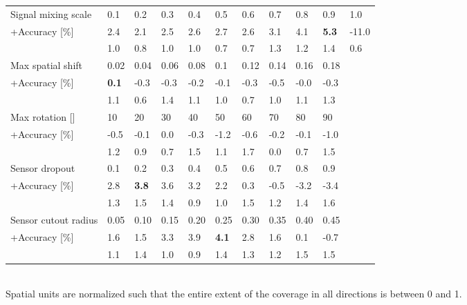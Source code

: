 \documentclass{article}
\newcommand{\std}[1]{{\scriptsize{#1}}}
\begin{document}
\begin{table}
\begin{tabular}{l|llllllllll}
    \midrule
Signal mixing scale
    & 0.1 & 0.2 & 0.3 & 0.4 & 0.5 & 0.6 & 0.7 & 0.8 & 0.9 & 1.0 \\
    \hspace{5pt}+Accuracy [\%]
    & 2.4 & 2.1 & 2.5 & 2.6 & 2.7 & 2.6 & 3.1 & 4.1 & \textbf{5.3} & -11.0 \\
    & \std{1.0} & \std{0.8} & \std{1.0} & \std{1.0} & \std{0.7} & \std{0.7} & \std{1.3} & \std{1.2} & \std{1.4} & \std{0.6} \\
    \midrule

Max spatial shift
    & 0.02 & 0.04 & 0.06 & 0.08 & 0.1 & 0.12 & 0.14 & 0.16 & 0.18 \\
    \hspace{5pt}+Accuracy [\%]
    & \textbf{0.1} & -0.3 & -0.3 & -0.2 & -0.1 & -0.3 & -0.5 & -0.0 & -0.3 \\
    & \std{1.1} & \std{0.6} & \std{1.4} & \std{1.1} & \std{1.0} & \std{0.7} & \std{1.0} & \std{1.1} & \std{1.3} \\
    \midrule

Max rotation []
    & 10 & 20 & 30 & 40 & 50 & 60 & 70 & 80 & 90 \\
    \hspace{5pt}+Accuracy [\%]
    & -0.5 & -0.1 & 0.0 & -0.3 & -1.2 & -0.6 & -0.2 & -0.1 & -1.0 \\
    & \std{1.2} & \std{0.9} & \std{0.7} & \std{1.5} & \std{1.1} & \std{1.7} & \std{0.0} & \std{0.7} & \std{1.5} \\
    \midrule

Sensor dropout 
    & 0.1 & 0.2 & 0.3 & 0.4 & 0.5 & 0.6 & 0.7 & 0.8 & 0.9 \\
    \hspace{5pt}+Accuracy [\%]
    & 2.8 & \textbf{3.8} & 3.6 & 3.2 & 2.2 & 0.3 & -0.5 & -3.2 & -3.4 \\
    & \std{1.3} & \std{1.5} & \std{1.4} & \std{0.9} & \std{1.0} & \std{1.5} & \std{1.2} & \std{1.4} & \std{1.6} \\
    \midrule

Sensor cutout radius
    & 0.05 & 0.10 & 0.15 & 0.20 & 0.25 & 0.30 & 0.35 & 0.40 & 0.45 \\
    \hspace{5pt}+Accuracy [\%]
    & 1.6 & 1.5 & 3.3 & 3.9 & \textbf{4.1} & 2.8 & 1.6 & 0.1 & -0.7 \\
    & \std{1.1} & \std{1.4} & \std{1.0} & \std{0.9} & \std{1.4} & \std{1.3} & \std{1.2} & \std{1.5} & \std{1.5} \\
    \bottomrule
  \end{tabular}\\
  \footnotesize{Spatial units are normalized such that the entire extent of the coverage in all directions is between 0 and 1.}
\end{table} 
\end{document}
